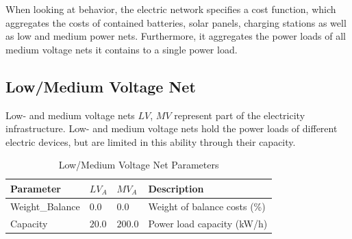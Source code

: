 



When looking at behavior, the electric network specifies a cost function, which aggregates the costs of contained batteries, solar panels, charging stations as well as low and medium power nets. Furthermore, it aggregates the power loads of all medium voltage nets it contains to a single power load.

\subsection{Low/Medium Voltage Net}

Low- and medium voltage nets $LV$, $MV$ represent part of the electricity infrastructure. 
Low- and medium voltage nets hold the power loads of different electric devices, but are limited in this ability through their capacity.

\begin{table}[h]
	\renewcommand{\arraystretch}{1.3}
	\caption{Low/Medium Voltage Net Parameters}
	\centering
	\begin{tabular}{llll}
		\hline
		\textbf{Parameter}   & \textbf{$LV_{A}$} & \textbf{$MV_{A}$}  & Description \\ \hline
		Weight\_Balance       & $0.0$ & $0.0$ & Weight of balance costs (\%) \\  
		Capacity          & $20.0$ & $200.0$ & Power load capacity (kW/h)     \\ \hline
	\end{tabular}
\end{table}


